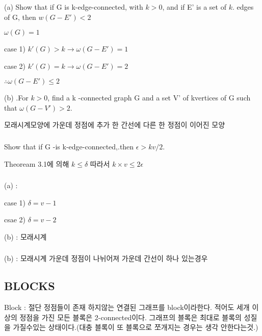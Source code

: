 \begin{theorem}
    
\end{theorem}

\subsubsection{}
(a) Show that if G is k-edge-connected, with $k >0$, and if E' is a set
of $k$. edges of G, then $w(G - E') < 2$

$\omega(G) = 1$

case 1) $k'(G) > k  \rightarrow \omega(G-E') = 1$

case 2) $k'(G) = k  \rightarrow \omega(G-E') = 2$

$ \therefore \omega(G-E') \le 2$


(b) .For $k > 0$, find a k -connected graph G and a set V' of kvertices
of G such that $\omega(G - V') > 2.$

모래시계모양에 가운데 정점에 추가 한 간선에 다른 한 정점이 이어진 모양 

\subsubsection{}
Show that if G -is k-edge-connected,.then $\epsilon > kv/2.$

Theoream 3.1에 의해 $k \le \delta$ 따라서 $k \times v \le 2\epsilon$

\subsubsection{}
(a)  : 

case 1) $\delta = v - 1$ 

csae 2) $\delta = v - 2$ 

(b) : 모래시계

\subsubsection{}
(b) : 모래시계 가운데 정점이 나뉘어져 가운데 간선이 하나 있는경우


\subsubsection{}





\subsection{BLOCKS}

\begin{dfn}[Blocks]
    Block : 절단 정점들이 존재 하지않는 연결된 그래프를 block이라한다.
    적어도 세개 이상의 정점을 가진 모든 블록은 2-connected이다.
    그래프의 블록은 최대로 블록의 성질을 가질수있는 상태이다.(대충 블록이 또 블록으로 쪼개지는 경우는 생각 안한다는것.)
\end{dfn}

\begin{theorem}
    
\end{theorem}